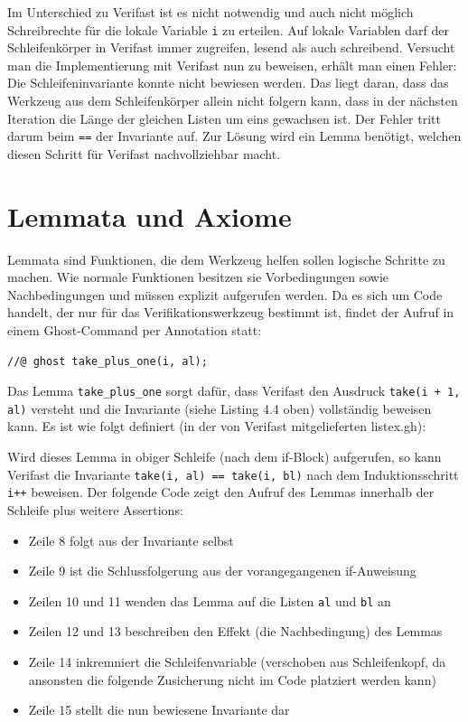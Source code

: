 Im Unterschied zu Verifast ist es nicht notwendig und auch nicht möglich Schreibrechte für die lokale Variable 
\lstinline{i} zu erteilen. Auf lokale Variablen darf der Schleifenkörper in Verifast immer zugreifen, lesend
als auch schreibend.
\newline
\newline
Versucht man die Implementierung mit Verifast nun zu beweisen, erhält man einen Fehler: Die Schleifeninvariante
konnte nicht bewiesen werden. 
Das liegt daran, dass das Werkzeug aus dem Schleifenkörper allein nicht folgern kann, dass in der nächsten Iteration 
die Länge der gleichen Listen um eins gewachsen ist. Der Fehler tritt darum beim \lstinline{==} der Invariante auf.
Zur Lösung wird ein Lemma benötigt, welchen diesen Schritt für Verifast nachvollziehbar macht.

\section{Lemmata und Axiome}
\label{verifizierung:lemma}

Lemmata sind Funktionen, die dem Werkzeug helfen sollen logische Schritte zu machen. Wie normale
Funktionen besitzen sie Vorbedingungen sowie Nachbedingungen und müssen explizit aufgerufen werden.
Da es sich um Code handelt, der nur für das Verifikationswerkzeug bestimmt ist, findet der Aufruf
in einem Ghost-Command per Annotation statt:

\lstset{frame=none, numbers=none}                      
\begin{lstlisting}
//@ ghost take_plus_one(i, al);
\end{lstlisting}
\lstset{frame=single, numbers=left}    
Das Lemma \lstinline{take_plus_one} sorgt dafür, dass Verifast den Ausdruck \lstinline{take(i + 1, al)}
versteht und die Invariante (siehe Listing 4.4 oben) vollständig beweisen kann. Es ist wie folgt
definiert (in der von Verifast mitgelieferten listex.gh):
\begin{figure}[H]

\end{figure}
Wird dieses Lemma in obiger Schleife (nach dem if-Block) aufgerufen, so kann Verifast
die Invariante \lstinline{take(i, al) == take(i, bl)} nach dem Induktionsschritt \lstinline{i++}
beweisen. Der folgende Code zeigt den Aufruf des Lemmas innerhalb der Schleife plus weitere Assertions:
\begin{itemize}
\item Zeile 8 folgt aus der Invariante selbst
\item Zeile 9 ist die Schlussfolgerung aus der vorangegangenen if-Anweisung
\item Zeilen 10 und 11 wenden das Lemma auf die Listen \lstinline{al} und \lstinline{bl} an
\item Zeilen 12 und 13 beschreiben den Effekt (die Nachbedingung) des Lemmas
\item Zeile 14 inkremniert die Schleifenvariable (verschoben aus Schleifenkopf, da ansonsten die folgende Zusicherung nicht im Code platziert werden kann)
\item Zeile 15 stellt die nun bewiesene Invariante dar
\end{itemize}

